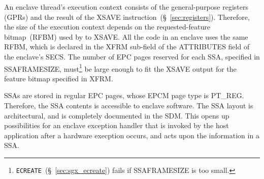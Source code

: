 An enclave thread's execution context consists of the general-purpose registers
(GPRs) and the result of the XSAVE instruction~(\S~\ref{sec:registers}).
Therefore, the size of the execution context depends on the requested-feature
bitmap~(RFBM) used by to XSAVE. All the code in an enclave uses the same RFBM,
which is declared in the XFRM sub-field of the ATTRIBUTES field of the
enclave's SECS. The number of EPC pages reserved for each SSA, specified in
SSAFRAMESIZE, must\footnote{\texttt{ECREATE}~(\S~\ref{sec:sgx_ecreate}) fails
if SSAFRAMESIZE is too small.} be large enough to fit the XSAVE output for the
feature bitmap specified in XFRM.

SSAs are stored in regular EPC pages, whose EPCM page type is PT\_REG.
Therefore, the SSA contents is accessible to enclave software. The SSA layout
is architectural, and is completely documented in the SDM. This opens up
possibilities for an enclave exception handler that is invoked by the host
application after a hardware execption occurs, and acts upon the information in
a SSA.
